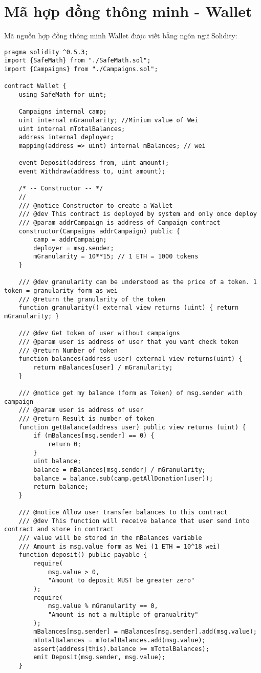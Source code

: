 \documentclass[../main-report.tex]{subfiles}
\begin{document}
\chapter{Mã hợp đồng thông minh - Wallet}
Mã nguồn hợp đồng thông minh Wallet được viết bằng ngôn ngữ Solidity:

\begin{lstlisting}
pragma solidity ^0.5.3;
import {SafeMath} from "./SafeMath.sol";
import {Campaigns} from "./Campaigns.sol";

contract Wallet {
    using SafeMath for uint;

    Campaigns internal camp;
    uint internal mGranularity; //Minium value of Wei
    uint internal mTotalBalances;
    address internal deployer;
    mapping(address => uint) internal mBalances; // wei

    event Deposit(address from, uint amount);
    event Withdraw(address to, uint amount);

    /* -- Constructor -- */
    //
    /// @notice Constructor to create a Wallet
    /// @dev This contract is deployed by system and only once deploy
    /// @param addrCampaign is address of Campaign contract
    constructor(Campaigns addrCampaign) public {
        camp = addrCampaign;
        deployer = msg.sender;
        mGranularity = 10**15; // 1 ETH = 1000 tokens
    }

    /// @dev granularity can be understood as the price of a token. 1 token = granularity form as wei
    /// @return the granularity of the token
    function granularity() external view returns (uint) { return mGranularity; }

    /// @dev Get token of user without campaigns
    /// @param user is address of user that you want check token
    /// @return Number of token
    function balances(address user) external view returns(uint) {
        return mBalances[user] / mGranularity;
    }

    /// @notice get my balance (form as Token) of msg.sender with campaign
    /// @param user is address of user
    /// @return Result is number of token
    function getBalance(address user) public view returns (uint) {
        if (mBalances[msg.sender] == 0) {
            return 0;
        }
        uint balance;
        balance = mBalances[msg.sender] / mGranularity;
        balance = balance.sub(camp.getAllDonation(user));
        return balance;
    }

    /// @notice Allow user transfer balances to this contract
    /// @dev This function will receive balance that user send into contract and store in contract
    /// value will be stored in the mBalances variable
    /// Amount is msg.value form as Wei (1 ETH = 10^18 wei)
    function deposit() public payable {
        require(
            msg.value > 0,
            "Amount to deposit MUST be greater zero"
        );
        require(
            msg.value % mGranularity == 0,
            "Amount is not a multiple of granualrity"
        );
        mBalances[msg.sender] = mBalances[msg.sender].add(msg.value);
        mTotalBalances = mTotalBalances.add(msg.value);
        assert(address(this).balance >= mTotalBalances);
        emit Deposit(msg.sender, msg.value);
    }


\end{lstlisting}
\end{document}
